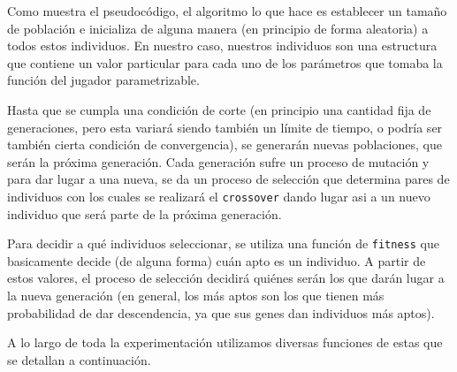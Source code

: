 \documentclass[A4paper,oneside,fleqn,11pt]{article}
\theoremstyle{definition}
\begin{document}
Como muestra el pseudocódigo, el algoritmo lo que hace es establecer un tamaño de población e inicializa de alguna manera (en principio de forma aleatoria) a todos estos individuos. En nuestro caso, nuestros individuos son una estructura que contiene un valor particular para cada uno de los parámetros que tomaba la función del jugador parametrizable.

Hasta que se cumpla una condición de corte (en principio una cantidad fija de generaciones, pero esta variará siendo también un límite de tiempo, o podría ser también cierta condición de convergencia), se generarán nuevas poblaciones, que serán la próxima generación. Cada generación sufre un proceso de mutación y para dar lugar a una nueva, se da un proceso de selección que determina pares de individuos con los cuales se realizará el \texttt{crossover} dando lugar asi a un nuevo individuo que será parte de la próxima generación.

Para decidir a qué individuos seleccionar, se utiliza una función de \texttt{fitness} que basicamente decide (de alguna forma) cuán apto es un individuo. A partir de estos valores, el proceso de selección decidirá quiénes serán los que darán lugar a la nueva generación (en general, los más aptos son los que tienen más probabilidad de dar descendencia, ya que sus genes dan individuos más aptos).

A lo largo de toda la experimentación utilizamos diversas funciones de estas que se detallan a continuación.
\end{document}
